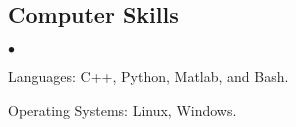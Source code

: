 \documentclass[margin,line]{res}
\newenvironment{list2}{
  \begin{list}{$\bullet$}{%
      \setlength{\itemsep}{0in}
      \setlength{\parsep}{0in} \setlength{\parskip}{0in}
      \setlength{\topsep}{0in} \setlength{\partopsep}{0in} 
      \setlength{\leftmargin}{0.2in}}}{\end{list}}
\begin{document}
\begin{resume}
%
%
%
%

%
\section{\sc Computer Skills}
\begin{list2}
\item Languages:  C++, Python, Matlab, and Bash.
\item Operating Systems:  Linux, Windows.\\
\end{list2}
\vspace*{-.15in}


\end{resume}
\end{document}
